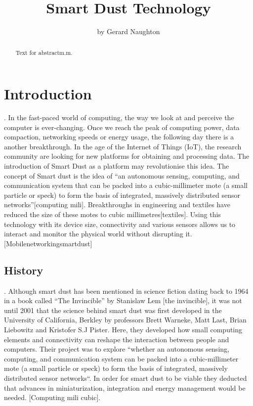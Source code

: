 \documentclass[article]{IEEEtran}
\begin{document}
\title{Smart Dust Technology }
\author{by Gerard Naughton }%

\maketitle

\begin{abstract}
Text for abstractm.m.
\end{abstract}


\section{Introduction}.\newline
In the fast-paced world of computing, the way we look at and perceive the computer is ever-changing. Once we reach the peak of computing power, data compaction, networking speeds or energy usage, the following day there is a another breakthrough. In the age of the Internet of Things (IoT), the research community are looking for new platforms for obtaining and processing data. The introduction of Smart Dust as a platform may revolutionise this idea. 
The concept of Smart dust is the idea of  “an autonomous sensing, computing, and communication system that can be packed into a cubic-millimeter mote (a small particle or speck) to form the basis of integrated, massively distributed sensor networks”[computing mili]. Breakthroughs in engineering and textiles have reduced the size of these motes to cubic millimetres[textiles]. Using this technology with its device size, connectivity and various sensors allows us to interact and monitor the physical world without disrupting it. [Mobilenetworkingsmartdust]


\subsection*{History}.\newline
Although smart dust has been mentioned in science fiction dating back to 1964 in a book called “The Invincible” by Stanislaw Lem [the invincible], it was not until 2001 that the science behind smart dust was first developed in the University of California, Berkley by professors Brett Warneke, Matt Last, Brian Liebowitz and Kristofer S.J Pister. 
Here, they developed how small computing elements and connectivity can reshape the interaction between people and computers. Their project was to explore “whether an autonomous sensing, computing, and communication system can be packed into a cubic-millimeter mote (a small particle or speck) to form the basis of integrated, massively distributed sensor networks“. In order for smart dust to be viable they deducted that advances in miniaturization, integration and energy management would be needed. [Computing mili cubic]. 
\end{document}
